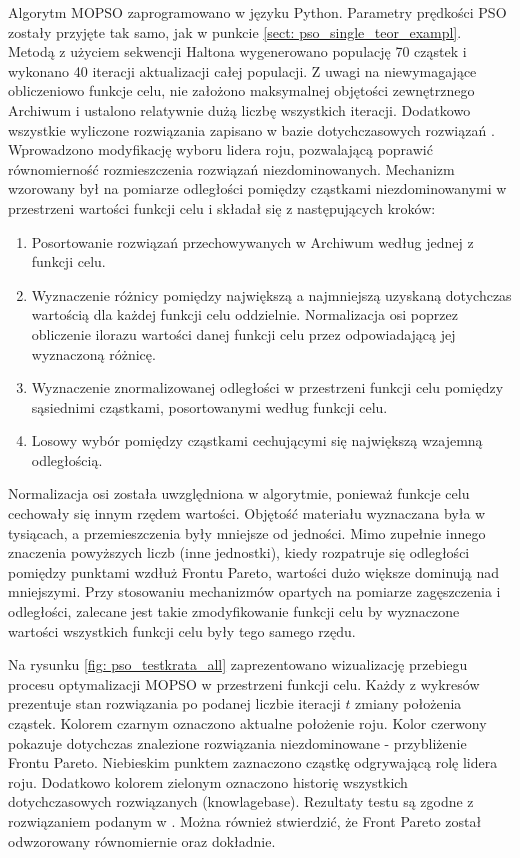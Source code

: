 Algorytm MOPSO zaprogramowano w języku Python. Parametry prędkości PSO zostały przyjęte tak samo, jak w punkcie \ref{sect: pso_single_teor_exampl}. Metodą z użyciem sekwencji Haltona wygenerowano populację 70 cząstek i wykonano 40 iteracji aktualizacji całej populacji. Z uwagi na niewymagające obliczeniowo funkcje celu, nie założono maksymalnej objętości zewnętrznego Archiwum i ustalono relatywnie dużą liczbę wszystkich iteracji. Dodatkowo wszystkie wyliczone rozwiązania zapisano w bazie dotychczasowych rozwiązań . Wprowadzono modyfikację wyboru lidera roju, pozwalającą poprawić równomierność rozmieszczenia rozwiązań niezdominowanych. Mechanizm wzorowany był na pomiarze odległości pomiędzy cząstkami niezdominowanymi w przestrzeni wartości funkcji celu \parencite{Deb2002} i składał się z następujących kroków:
\begin{enumerate}
	\item Posortowanie rozwiązań przechowywanych w Archiwum według jednej z funkcji celu.
	\item Wyznaczenie różnicy pomiędzy największą a najmniejszą uzyskaną dotychczas wartością dla każdej funkcji celu oddzielnie. Normalizacja osi poprzez obliczenie ilorazu wartości danej funkcji celu przez odpowiadającą jej wyznaczoną różnicę.
	\item Wyznaczenie znormalizowanej odległości w przestrzeni funkcji celu pomiędzy sąsiednimi cząstkami, posortowanymi według funkcji celu.
	\item Losowy wybór pomiędzy cząstkami cechującymi się największą wzajemną odległością.
\end{enumerate}
Normalizacja osi została uwzględniona w algorytmie, ponieważ funkcje celu cechowały się innym rzędem wartości. Objętość materiału wyznaczana była w tysiącach, a przemieszczenia były mniejsze od jedności. Mimo zupełnie innego znaczenia powyższych liczb (inne jednostki), kiedy rozpatruje się odległości pomiędzy punktami wzdłuż Frontu Pareto, wartości dużo większe dominują nad mniejszymi. Przy stosowaniu mechanizmów opartych na pomiarze zagęszczenia i odległości, zalecane jest takie zmodyfikowanie funkcji celu by wyznaczone wartości wszystkich funkcji celu były tego samego rzędu.

Na rysunku \ref{fig: pso_testkrata_all} zaprezentowano wizualizację przebiegu procesu optymalizacji MOPSO w przestrzeni funkcji celu. Każdy z wykresów prezentuje stan rozwiązania po podanej liczbie iteracji $t$ zmiany położenia cząstek. Kolorem czarnym oznaczono aktualne położenie roju. Kolor czerwony pokazuje dotychczas znalezione rozwiązania niezdominowane - przybliżenie Frontu Pareto. Niebieskim punktem zaznaczono cząstkę odgrywającą rolę lidera roju. Dodatkowo kolorem zielonym oznaczono historię wszystkich dotychczasowych rozwiązanych (knowlagebase). Rezultaty testu są zgodne z rozwiązaniem podanym w \parencite{Zavala2014}. Można również stwierdzić, że Front Pareto został odwzorowany równomiernie oraz dokładnie.


